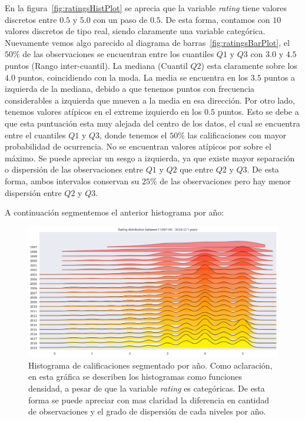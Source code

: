 \documentclass[11pt,a4paper,twoside]{thesis}
\begin{document}
En la figura~\ref{fig:ratingsHistPlot} se aprecia que la variable
\textit{rating} tiene valores discretos entre $0.5$ y $5.0$ con un paso de
$0.5$. De esta forma, contamos con $10$ valores discretos de tipo real, siendo
claramente una variable categórica. Nuevamente vemos algo parecido al diagrama
de barras~\ref{fig:ratingsBarPlot}, el $50\%$ de las observaciones se
encuentran entre los cuantiles $Q1$ y $Q3$ con $3.0$ y $4.5$ puntos (Rango
inter-cuantil). La mediana (Cuantil $Q2$) esta claramente sobre los $4.0$
puntos, coincidiendo con la moda. La media se encuentra en los $3.5$ puntos a
izquierda de la mediana, debido a que tenemos puntos con frecuencia
considerables a izquierda que mueven a la media en esa dirección. Por otro
lado, tenemos valores atípicos en el extreme izquierdo en los $0.5$ puntos.
Esto se debe a que esta puntuación esta muy alejada del centro de los datos, el
cual se encuentra entre el cuantiles $Q1$ y $Q3$, donde tenemos el $50\%$ las
calificaciones con mayor probabilidad de ocurrencia. No se encuentran valores
atípicos por sobre el máximo. Se puede apreciar un sesgo a izquierda, ya que
existe mayor separación o dispersión de las observaciones entre $Q1$ y $Q2$ que
entre $Q2$ y $Q3$. De esta forma, ambos intervalos conservan su $25\%$ de las
observaciones pero hay menor dispersión entre $Q2$ y $Q3$.

\clearpage
A continuación segmentemos el anterior histograma por año:

\begin{figure}[h!]
	\centering
	\includegraphics[width=15cm]{./images/rating-by-year.png}
	\caption{
		Histograma de calificaciones segmentado por año.
		Como aclaración, en esta gráfica se describen los histogramas
		como funciones densidad, a pesar de que la variable \textit{rating}
		es categóricas. De esta forma se puede apreciar con mas claridad
		la diferencia en cantidad de observaciones y el grado de dispersión de cada
		niveles por año.
	}
	\label{fig:ratingsYearHistPlot}
\end{figure}
\end{document}

